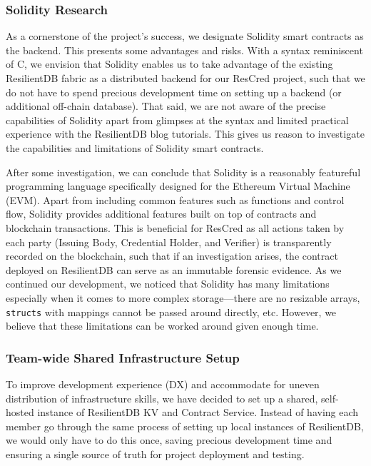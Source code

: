 \subsubsection{Solidity Research}

As a cornerstone of the project’s success, we designate Solidity smart contracts as the backend. This presents some advantages and risks. With a syntax reminiscent of C, we envision that Solidity enables us to take advantage of the existing ResilientDB fabric as a distributed backend for our ResCred project, such that we do not have to spend precious development time on setting up a backend (or additional off-chain database). That said, we are not aware of the precise capabilities of Solidity apart from glimpses at the syntax and limited practical experience with the ResilientDB blog tutorials. This gives us reason to investigate the capabilities and limitations of Solidity smart contracts.

After some investigation, we can conclude that Solidity is a reasonably featureful programming
language specifically designed for the Ethereum Virtual Machine (EVM). Apart from including common
features such as functions and control flow, Solidity provides additional features built on top of
contracts and blockchain transactions. This is beneficial for ResCred as all actions taken by each
party (Issuing Body, Credential Holder, and Verifier) is transparently recorded on the blockchain,
such that if an investigation arises, the contract deployed on ResilientDB can serve as an immutable
forensic evidence. As we continued our development, we noticed that Solidity has many limitations
especially when it comes to more complex storage—there are no resizable arrays, \verb|structs| with mappings cannot be passed around directly, etc. However, we believe that these limitations can be worked around given enough time.

\subsubsection{Team-wide Shared Infrastructure Setup}

To improve development experience (DX) and accommodate for uneven distribution of infrastructure skills, we have decided to set up a shared, self-hosted instance of ResilientDB KV and Contract Service. Instead of having each member go through the same process of setting up local instances of ResilientDB, we would only have to do this once, saving precious development time and ensuring a single source of truth for project deployment and testing.

